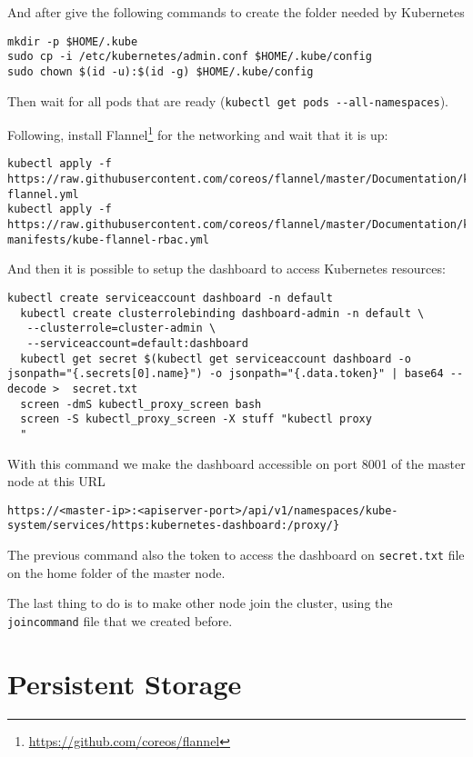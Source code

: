 And after give the following commands to create the folder needed by
Kubernetes

\begin{lstlisting}
mkdir -p $HOME/.kube
sudo cp -i /etc/kubernetes/admin.conf $HOME/.kube/config
sudo chown $(id -u):$(id -g) $HOME/.kube/config
\end{lstlisting}

Then wait for all pods that are ready
(\texttt{kubectl\ get\ pods\ -\/-all-namespaces}).

Following, install Flannel\footnote{\url{https://github.com/coreos/flannel}}
for the networking and wait that it is up:

\begin{lstlisting}
kubectl apply -f https://raw.githubusercontent.com/coreos/flannel/master/Documentation/kube-flannel.yml
kubectl apply -f https://raw.githubusercontent.com/coreos/flannel/master/Documentation/k8s-manifests/kube-flannel-rbac.yml
\end{lstlisting}

And then it is possible to setup the dashboard to access Kubernetes resources:

\begin{lstlisting}
kubectl create serviceaccount dashboard -n default
  kubectl create clusterrolebinding dashboard-admin -n default \
   --clusterrole=cluster-admin \
   --serviceaccount=default:dashboard
  kubectl get secret $(kubectl get serviceaccount dashboard -o jsonpath="{.secrets[0].name}") -o jsonpath="{.data.token}" | base64 --decode >  secret.txt
  screen -dmS kubectl_proxy_screen bash
  screen -S kubectl_proxy_screen -X stuff "kubectl proxy
  "
\end{lstlisting}

With this command we make the dashboard accessible on port 8001 of the
master node at this URL
\begin{verbatim}
https://<master-ip>:<apiserver-port>/api/v1/namespaces/kube-system/services/https:kubernetes-dashboard:/proxy/}
\end{verbatim}

The previous command also the token to access the dashboard on
\texttt{secret.txt} file on the home folder of the master node.

The last thing to do is to make other node join the cluster, using the
\texttt{joincommand} file that we created before.

\section{Persistent Storage}\label{persistent-storage}

